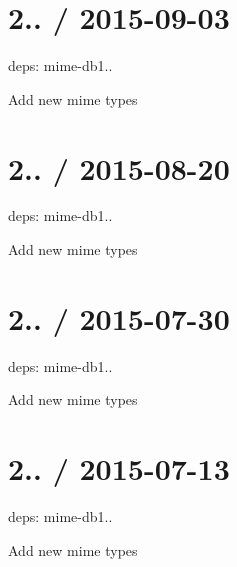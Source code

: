 \section*{2.. / 2015-\/09-\/03 }


\begin{DoxyItemize}
\item deps\+: mime-\/db1..
\begin{DoxyItemize}
\item Add new mime types
\end{DoxyItemize}
\end{DoxyItemize}

\section*{2.. / 2015-\/08-\/20 }


\begin{DoxyItemize}
\item deps\+: mime-\/db1..
\begin{DoxyItemize}
\item Add new mime types
\end{DoxyItemize}
\end{DoxyItemize}

\section*{2.. / 2015-\/07-\/30 }


\begin{DoxyItemize}
\item deps\+: mime-\/db1..
\begin{DoxyItemize}
\item Add new mime types
\end{DoxyItemize}
\end{DoxyItemize}

\section*{2.. / 2015-\/07-\/13 }


\begin{DoxyItemize}
\item deps\+: mime-\/db1..
\begin{DoxyItemize}
\item Add new mime types
\end{DoxyItemize}
\end{DoxyItemize}

